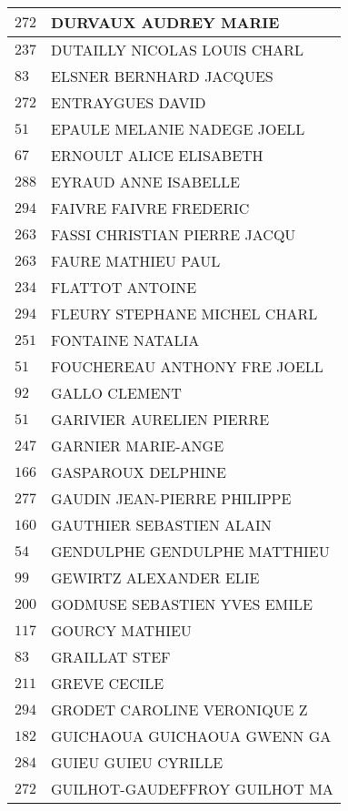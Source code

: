 \begin{xltabular}{\linewidth}{|l|X|}
    \hline
    $272$ & DURVAUX AUDREY MARIE \\
    \hline
    $237$ & DUTAILLY NICOLAS LOUIS CHARL \\
    \hline
    $83$ & ELSNER BERNHARD JACQUES \\
    \hline
    $272$ & ENTRAYGUES DAVID \\
    \hline
    $51$ & EPAULE MELANIE NADEGE JOELL \\
    \hline
    $67$ & ERNOULT ALICE ELISABETH \\
    \hline
    $288$ & EYRAUD ANNE ISABELLE \\
    \hline
    $294$ & FAIVRE FAIVRE FREDERIC \\
    \hline
    $263$ & FASSI CHRISTIAN PIERRE JACQU \\
    \hline
    $263$ & FAURE MATHIEU PAUL \\
    \hline
    $234$ & FLATTOT ANTOINE \\
    \hline
    $294$ & FLEURY STEPHANE MICHEL CHARL \\
    \hline
    $251$ & FONTAINE NATALIA \\
    \hline
    $51$ & FOUCHEREAU ANTHONY FRE JOELL \\
    \hline
    $92$ & GALLO CLEMENT \\
    \hline
    $51$ & GARIVIER AURELIEN PIERRE \\
    \hline
    $247$ & GARNIER MARIE-ANGE \\
    \hline
    $166$ & GASPAROUX DELPHINE \\
    \hline
    $277$ & GAUDIN JEAN-PIERRE PHILIPPE \\
    \hline
    $160$ & GAUTHIER SEBASTIEN ALAIN \\
    \hline
    $54$ & GENDULPHE GENDULPHE MATTHIEU \\
    \hline
    $99$ & GEWIRTZ ALEXANDER ELIE \\
    \hline
    $200$ & GODMUSE SEBASTIEN YVES EMILE \\
    \hline
    $117$ & GOURCY MATHIEU \\
    \hline
    $83$ & GRAILLAT STEF \\
    \hline
    $211$ & GREVE CECILE \\
    \hline
    $294$ & GRODET CAROLINE VERONIQUE Z \\
    \hline
    $182$ & GUICHAOUA GUICHAOUA GWENN GA \\
    \hline
    $284$ & GUIEU GUIEU CYRILLE \\
    \hline
    $272$ & GUILHOT-GAUDEFFROY GUILHOT MA \\

\end{xltabular}

